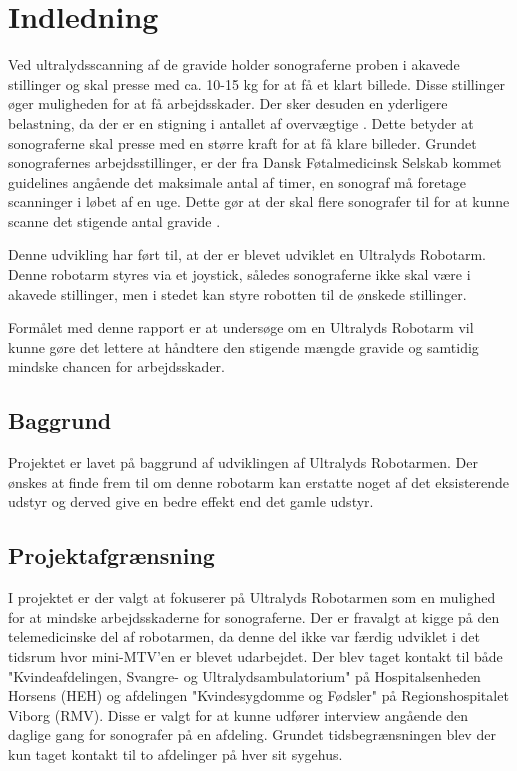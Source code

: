 \chapter{Indledning} 
Ved ultralydsscanning af de gravide holder sonograferne proben i akavede stillinger og skal presse med ca. 10-15 kg for at få et klart billede. Disse stillinger øger muligheden for at få arbejdsskader. Der sker desuden en yderligere belastning, da der er en stigning i antallet af overvægtige \cite{Overvaegt}. Dette betyder at sonograferne skal presse med en større kraft for at få klare billeder. Grundet sonografernes arbejdsstillinger, er der fra Dansk Føtalmedicinsk Selskab kommet guidelines angående det maksimale antal af timer, en sonograf må foretage scanninger i løbet af en uge. Dette gør at der skal flere sonografer til for at kunne scanne det stigende antal gravide \cite{Foedsler}.

Denne udvikling har ført til, at der er blevet udviklet en Ultralyds Robotarm. Denne robotarm styres via et joystick, således sonograferne ikke skal være i akavede stillinger, men i stedet kan styre robotten til de ønskede stillinger. 

Formålet med denne rapport er at undersøge om en Ultralyds Robotarm vil kunne gøre det lettere at håndtere den stigende mængde gravide og samtidig mindske chancen for arbejdsskader.  

\section{Baggrund}
Projektet er lavet på baggrund af udviklingen af Ultralyds Robotarmen. Der ønskes at finde frem til om denne robotarm kan erstatte noget af det eksisterende udstyr og derved give en bedre effekt end det gamle udstyr.

\section{Projektafgrænsning}
 I projektet er der valgt at fokuserer på Ultralyds Robotarmen som en mulighed for at mindske arbejdsskaderne for sonograferne. Der er fravalgt at kigge på den telemedicinske del af robotarmen, da denne del ikke var færdig udviklet i det tidsrum hvor mini-MTV'en er blevet udarbejdet.  
 Der blev taget kontakt til både "Kvindeafdelingen, Svangre- og Ultralydsambulatorium" på Hospitalsenheden Horsens (HEH) og afdelingen "Kvindesygdomme og Fødsler" på Regionshospitalet Viborg (RMV). Disse er valgt for at kunne udfører interview angående den daglige gang for sonografer på en afdeling. Grundet tidsbegrænsningen blev der kun taget kontakt til to afdelinger på hver sit sygehus. 

\label{version_Systemark}
